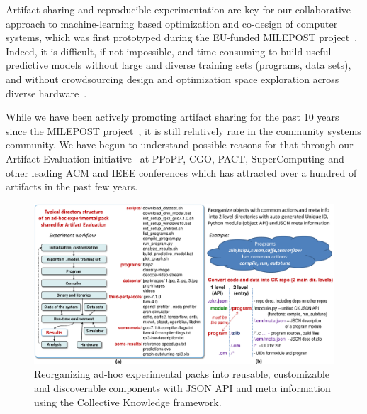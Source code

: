 Artifact sharing and reproducible experimentation are key
for our collaborative approach to machine-learning based optimization
and co-design of computer systems, which was first prototyped
during the EU-funded MILEPOST project~\cite{Fur2009,milepost,29db2248aba45e59:a31e374796869125}.
%
Indeed, it is difficult, if not impossible, and time consuming to build useful predictive models
without large and diverse training sets (programs, data sets),
and without crowdsourcing design and optimization space exploration
across diverse hardware~\cite{new_pub_model,cm:29db2248aba45e59:cd11e3a188574d80}.%

While we have been actively promoting artifact sharing for the past 10 years
since the MILEPOST project~\cite{Fur2009,ctuning1}, it is still relatively rare in the community
systems community.
%
We have begun to understand possible reasons for that through our Artifact
Evaluation initiative~\cite{ctuning-ae1,childers2016artifact} 
at PPoPP, CGO, PACT, SuperComputing and other leading ACM and IEEE conferences
which has attracted over a hundred of artifacts in the past few years.

   \begin{figure}[htbp]
     \centering
      \includegraphics[width=6.5in]
      {ck-assets/4094a9fad1c48a5e-cropped.pdf} %
     \caption{
       Reorganizing ad-hoc experimental packs into reusable, customizable and discoverable components
       with JSON API and meta information using the Collective Knowledge framework.
     }
     \label{fig:convert-to-ck}
   \end{figure}

